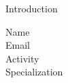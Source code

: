 \begin{frame}{Introduction}
  \begin{description}
    \item[Name] \TrainerName
    \item[Email] \TrainerEmail
    \item[Activity] \TrainerActivityEn
    \item[Specialization] \TrainerSpecializationEn
  \end{description}
\end{frame}